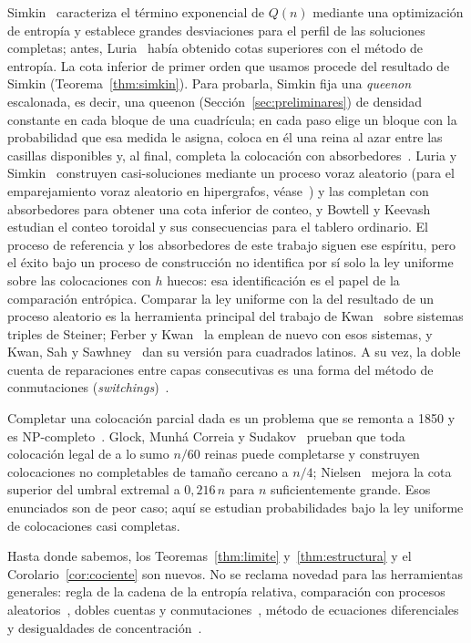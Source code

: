 Simkin~\cite{Simkin} caracteriza el término exponencial de $Q(n)$ mediante una optimización de
entropía y establece grandes desviaciones para el perfil de las soluciones completas; antes,
Luria~\cite{Luria} había obtenido cotas superiores con el método de entropía. La cota inferior
de primer orden que usamos procede del resultado de Simkin (Teorema~\ref{thm:simkin}). Para
probarla, Simkin fija una \emph{queenon} escalonada, es decir, una queenon
(Sección~\ref{sec:preliminares}) de densidad constante en cada bloque de una cuadrícula; en cada
paso elige un bloque con la probabilidad que esa medida le asigna, coloca en él una
reina al azar entre las casillas disponibles y, al final, completa la colocación con
absorbedores~\cite[Sección~5]{Simkin}. Luria y Simkin~\cite{LS} construyen casi-soluciones
mediante un proceso voraz aleatorio (para el emparejamiento voraz aleatorio en hipergrafos,
véase~\cite{BennettBohman}) y las completan con absorbedores para obtener una cota
inferior de conteo, y Bowtell y Keevash~\cite{BK} estudian el conteo toroidal y sus
consecuencias para el tablero ordinario. El proceso de referencia y los absorbedores de este
trabajo siguen ese espíritu, pero el éxito bajo un proceso de construcción no identifica por sí
solo la ley uniforme sobre las colocaciones con $h$ huecos: esa identificación es el papel de
la comparación entrópica. Comparar la ley uniforme con la del resultado de un proceso aleatorio
es la herramienta principal del trabajo de Kwan~\cite{Kwan} sobre sistemas triples de Steiner;
Ferber y Kwan~\cite{FerberKwan} la emplean de nuevo con esos sistemas, y Kwan, Sah y
Sawhney~\cite{KSS} dan su versión para cuadrados latinos.
A su vez, la doble cuenta de reparaciones entre capas consecutivas es una forma del método de
conmutaciones (\emph{switchings})~\cite{McKayWormald,HMcK}.

Completar una colocación parcial dada es un problema que se remonta a 1850 y es
NP-completo~\cite{GJN}. Glock, Munhá Correia y
Sudakov~\cite{GMS} prueban que toda colocación legal de a lo sumo $n/60$ reinas puede
completarse y construyen colocaciones no completables de tamaño cercano a $n/4$;
Nielsen~\cite{Nielsen} mejora la cota superior del umbral extremal a $0{,}216\,n$ para $n$
suficientemente grande. Esos
enunciados son de peor caso; aquí se estudian probabilidades bajo la ley uniforme de
colocaciones casi completas.

Hasta donde sabemos, los
Teoremas~\ref{thm:limite} y~\ref{thm:estructura} y el Corolario~\ref{cor:cociente} son nuevos.
No se reclama novedad para las herramientas generales: regla de la cadena de la entropía
relativa, comparación con procesos aleatorios~\cite{Kwan}, dobles cuentas y
conmutaciones~\cite{HMcK}, método de ecuaciones
diferenciales~\cite{Wormald,Warnke,BennettDudek} y desigualdades de
concentración~\cite{AlonSpencer}.
